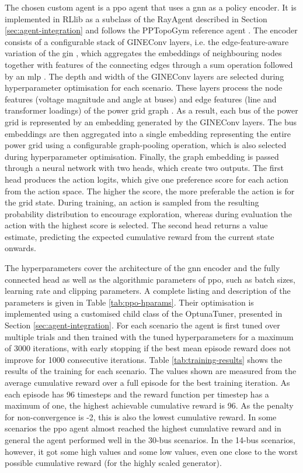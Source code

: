 The chosen custom agent is a \ac{ppo} agent that uses a \ac{gnn} as a policy encoder. It is implemented in RLlib as a subclass of the RayAgent described in Section \ref{sec:agent-integration} and follows the PPTopoGym reference agent \cite{pptopogym}. The encoder consists of a configurable stack of GINEConv layers, i.e. the edge-feature-aware variation of the \ac{gin} \cite{ginPaper}, which aggregates the embeddings of neighbouring nodes together with features of the connecting edges through a sum operation followed by an \ac{mlp} \cite{ginePaper}. The depth and width of the GINEConv layers are selected during hyperparameter optimisation for each scenario. These layers process the node features (voltage magnitude and angle at buses) and edge features (line and transformer loadings) of the power grid graph \cite{pptopogym}. As a result, each bus of the power grid is represented by an embedding generated by the GINEConv layers. The bus embeddings are then aggregated into a single embedding representing the entire power grid using a configurable graph-pooling operation, which is also selected during hyperparameter optimisation. Finally, the graph embedding is passed through a neural network with two heads, which create two outputs. The first head produces the action logits, which give one preference score for each action from the action space. The higher the score, the more preferable the action is for the grid state. During training, an action is sampled from the resulting probability distribution to encourage exploration, whereas during evaluation the action with the highest score is selected. The second head returns a value estimate, predicting the expected cumulative reward from the current state onwards.

The hyperparameters cover the architecture of the \ac{gnn} encoder and the fully connected head as well as the algorithmic parameters of \ac{ppo}, such as batch sizes, learning rate and clipping parameters. A complete listing and description of the parameters is given in Table \ref{tab:ppo-hparams}. Their optimisation is implemented using a customised child class of the OptunaTuner, presented in Section \ref{sec:agent-integration}. For each scenario the agent is first tuned over multiple trials and then trained with the tuned hyperparameters for a maximum of 3000 iterations, with early stopping if the best mean episode reward does not improve for 1000 consecutive iterations. Table \ref{tab:training-results} shows the results of the training for each scenario. The values shown are measured from the average cumulative reward over a full episode for the best training iteration. As each episode has 96 timesteps and the reward function per timestep has a maximum of one, the highest achievable cumulative reward is 96. As the penalty for non-convergence is -2, this is also the lowest cumulative reward. In some scenarios the \ac{ppo} agent almost reached the highest cumulative reward and in general the agent performed well in the 30-bus scenarios. In the 14-bus scenarios, however, it got some high values and some low values, even one close to the worst possible cumulative reward (for the highly scaled generator). 

